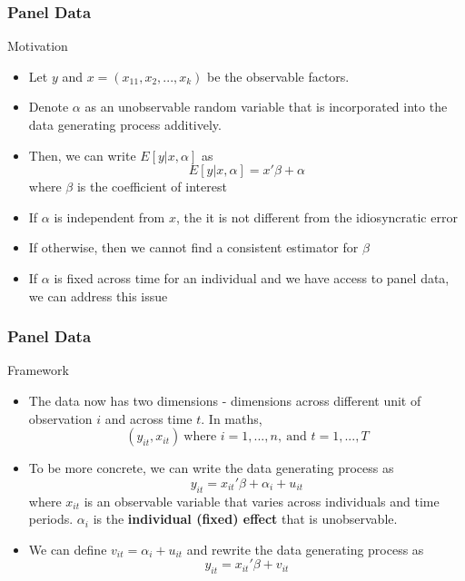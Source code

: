 \documentclass{beamer}
\begin{document}
\begin{frame}
\frametitle{Panel Data}
Motivation
\begin{itemize}
\item   Let $y$ and $x=(x_11,x_2,...,x_k)$ be the observable factors.
\item Denote $\alpha$ as an unobservable random variable that is incorporated into the data generating process additively.
\item Then, we can write $E[y|x,\alpha]$ as 
\[
E[y|x,\alpha] = x'\beta+\alpha
\]
where $\beta$ is the coefficient of interest
\item If $\alpha$ is independent from $x$, the it is not different from the idiosyncratic error
\item If otherwise, then we cannot find a consistent estimator for $\beta$
\item If $\alpha$ is fixed across time for an individual and we have access to panel data, we can address this issue
\end{itemize}
\end{frame}

\begin{frame}
\frametitle{Panel Data}
Framework
\begin{itemize}
\item The data now has two dimensions - dimensions across different unit of observation $i$ and across time $t$. In maths, 
\[
(y_{it},x_{it}) \ \text{where } i=1,...,n, \ \text{and }  t=1,...,T
\]
\item To be more concrete, we can write the data generating process as
\[
y_{it}= x_{it}'\beta+\alpha_i+u_{it} 
\]
where $x_{it}$ is an observable variable that varies across individuals and time periods. $\alpha_i$ is the \textbf{individual (fixed) effect} that is unobservable. 
\item We can define $v_{it}=\alpha_i+u_{it}$ and rewrite the data generating process as
\[
y_{it}= x_{it}'\beta+v_{it}
\]
\end{itemize}
\end{frame}
\end{document}
